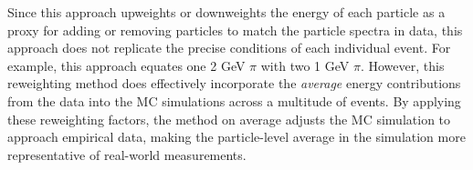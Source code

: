 Since this approach upweights or downweights the energy of each particle as a proxy for adding or removing particles to match the particle spectra in data, this approach does not replicate the precise conditions of each individual event.
For example, this approach equates one 2 GeV $\pi$ with two 1 GeV $\pi$.
However, this reweighting method does effectively incorporate the \textit{average} energy contributions from the data into the MC simulations across a multitude of events. 
By applying these reweighting factors, the method on average adjusts the MC simulation to approach empirical data, making the particle-level average \detdeta in the simulation more representative of real-world measurements. 